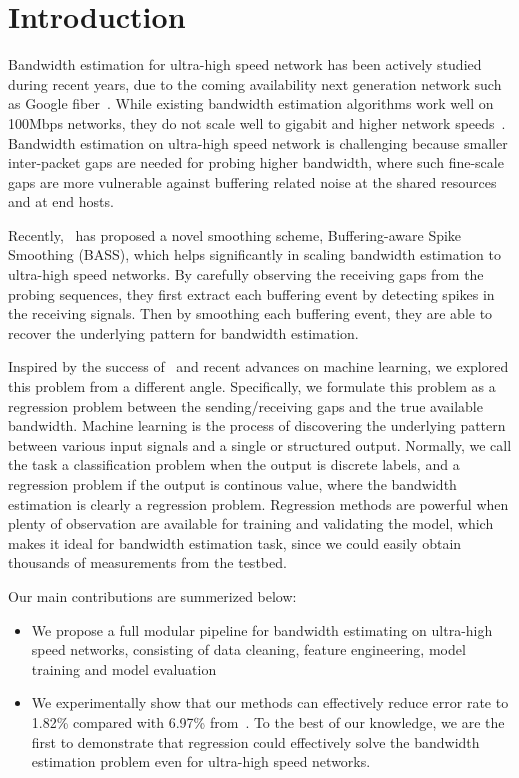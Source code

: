 \section{Introduction}
\label{sec:intro}
Bandwidth estimation for ultra-high speed network has been actively studied during recent years, due to the coming availability next generation network such as Google fiber~\cite{GoogleFiber}.
While existing bandwidth estimation algorithms work well on 100Mbps networks, they do not scale well to gigabit and higher network speeds~\cite{shriram2005}.
Bandwidth estimation on ultra-high speed network is challenging because smaller inter-packet gaps are needed for probing higher bandwidth, where such fine-scale gaps are more vulnerable against buffering related noise at the shared resources and at end hosts.

Recently,~\cite{Yin2014} has proposed a novel smoothing scheme, Buffering-aware Spike Smoothing (BASS), which helps significantly in scaling bandwidth estimation to ultra-high speed networks.
By carefully observing the receiving gaps from the probing sequences, they first extract each buffering event by detecting spikes in the receiving signals.
Then by smoothing each buffering event, they are able to recover the underlying pattern for bandwidth estimation.

Inspired by the success of~\cite{Yin2014} and recent advances on machine learning, we explored this problem from a different angle.
Specifically, we formulate this problem as a regression problem between the sending/receiving gaps and the true available bandwidth.
Machine learning is the process of discovering the underlying pattern between various input signals and a single or structured output.
Normally, we call the task a classification problem when the output is discrete labels, and a regression problem if the output is continous value, where the bandwidth estimation is clearly a regression problem.
Regression methods are powerful when plenty of observation are available for training and validating the model, which makes it ideal for bandwidth estimation task, since we could easily obtain thousands of measurements from the testbed.

Our main contributions are summerized below:
\begin{itemize}
\item We propose a full modular pipeline for bandwidth estimating on ultra-high speed networks, consisting of data cleaning, feature engineering, model training and model evaluation
\item We experimentally show that our methods can effectively reduce error rate to 1.82\% compared with 6.97\% from~\cite{Yin2014}. To the best of our knowledge, we are the first to demonstrate that regression could effectively solve the bandwidth estimation problem even for ultra-high speed networks.
\end{itemize}

